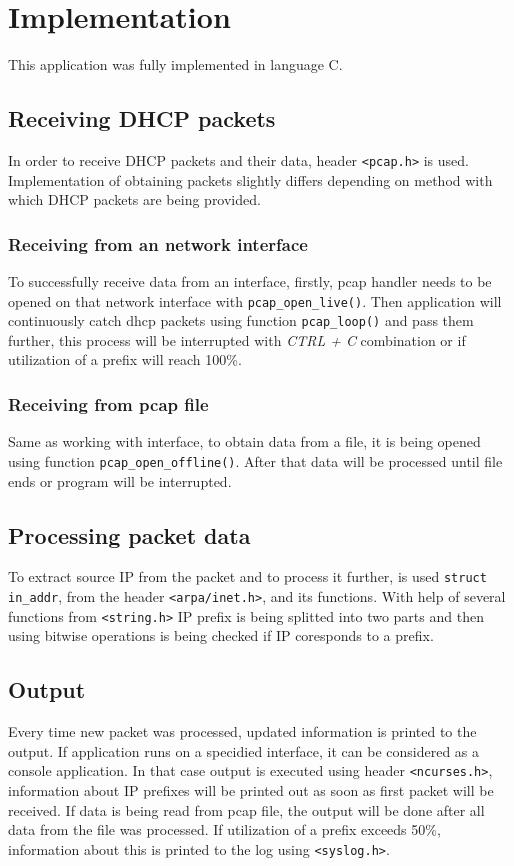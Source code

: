 \documentclass[english]{fitiel} %
\begin{document}
	\section{Implementation}
	This application was fully implemented in language C.
	\subsection{Receiving DHCP packets}
	In order to receive DHCP packets and their data, header \verb|<pcap.h>| is used. Implementation of obtaining packets slightly differs depending on method with which DHCP packets are being provided.
	\subsubsection{Receiving from an network interface}
	To successfully receive data from an interface, firstly, pcap handler needs to be opened on that network interface with \verb|pcap_open_live()|.
	Then application will continuously catch dhcp packets using function \verb|pcap_loop()| and pass them further, this process will be interrupted with \emph{CTRL + C} combination or if utilization of a prefix will reach 100\%.
	\subsubsection{Receiving from pcap file}
	Same as working with interface, to obtain data from a file, it is being opened using function \verb|pcap_open_offline()|.
	After that data will be processed until file ends or program will be interrupted.
	\subsection{Processing packet data}
	To extract source IP from the packet and to process it further, is used \verb|struct in_addr|, from the header \verb|<arpa/inet.h>|, and its functions.
	With help of several functions from \verb|<string.h>| IP prefix is being splitted into two parts and then using bitwise operations is being checked if IP coresponds to a prefix.\cite{string}
	\subsection{Output}
	Every time new packet was processed, updated information is printed to the output. If application runs on a specidied interface, it can be considered as a console application.
	In that case output is executed using header \verb|<ncurses.h>|, information about IP prefixes will be printed out as soon as first packet will be received\cite{ncurses}. 
	If data is being read from pcap file, the output will be done after all data from the file was processed.
	If utilization of a prefix exceeds 50\%, information about this is printed to the log using \verb|<syslog.h>|.\cite{Syslog}
\end{document}

